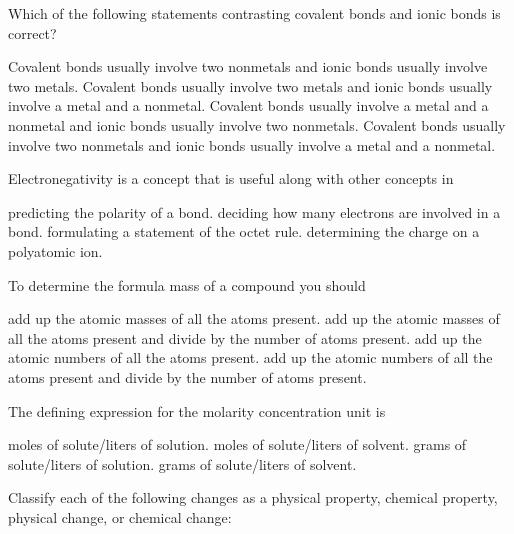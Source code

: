 \documentclass[addpoints, 12pt]{exam}
\begin{document}
\begin{questions}
\question[2]  Which of the following statements contrasting covalent bonds and  ionic bonds is correct?
\begin{choices}
\choice Covalent bonds usually involve two nonmetals and ionic bonds usually involve two metals.
\choice Covalent bonds usually involve two metals and ionic bonds usually involve a metal and a nonmetal.
\choice Covalent bonds usually involve a metal and a nonmetal and ionic bonds usually involve two nonmetals.
\choice Covalent bonds usually involve two nonmetals and ionic bonds usually involve a metal and a nonmetal.
\end{choices}

\question[2] Electronegativity is a concept that is useful along with other concepts in
\begin{choices}
\choice predicting the polarity of a bond.
\choice deciding how many electrons are involved in a bond.
\choice formulating a statement of the octet rule.
\choice determining the charge on a polyatomic ion.
\end{choices}

\question[2]To determine the formula mass of a compound you should
\begin{choices}
\choice add up the atomic masses of all the atoms present.
\choice add up the atomic masses of all the atoms present and divide by the number of atoms present.
\choice add up the atomic numbers of all the atoms present.
\choice add up the atomic numbers of all the atoms present and divide by the number of atoms present.
\end{choices}

\question[2]  The defining expression for the molarity concentration unit is
\begin{choices}
\choice moles of solute/liters of solution.
\choice moles of solute/liters of solvent.
\choice grams of solute/liters of solution.
\choice grams of solute/liters of solvent.
\end{choices}

\question[8]
Classify each of the following changes as a physical property,
chemical property, physical change, or chemical change:
\end{questions}
\end{document}
